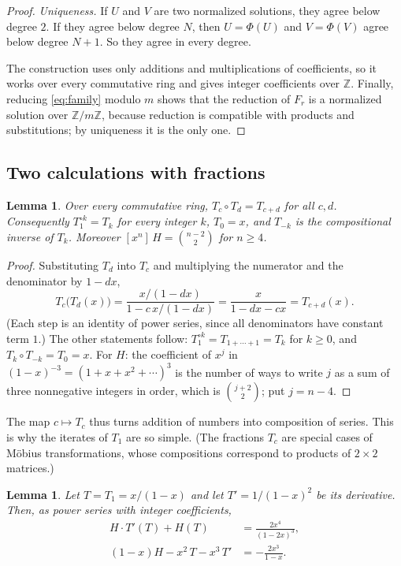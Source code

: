\documentclass[11pt,a4paper]{article}
\newtheorem{lemma}[theorem]{Lemma}
\theoremstyle{definition}
\theoremstyle{remark}
\newcommand{\Z}{\mathbb{Z}}
\newcommand{\coeff}[2]{[x^{#1}]\,#2}
\begin{document}
\begin{proof}
\emph{Uniqueness.} If $U$ and $V$ are two normalized solutions, they agree below degree $2$. If they agree below
degree $N$, then $U=\Phi(U)$ and $V=\Phi(V)$ agree below degree $N+1$. So they agree in every degree.

The construction uses only additions and multiplications of coefficients, so it works over every commutative ring
and gives integer coefficients over $\Z$. Finally, reducing \eqref{eq:family} modulo $m$ shows that the reduction of
$F_r$ is a normalized solution over $\Z/m\Z$, because reduction is compatible with products and substitutions; by
uniqueness it is the only one.
\end{proof}

\subsection{Two calculations with fractions}

\begin{lemma}\label{lem:mobius}
Over every commutative ring, $T_c\circ T_d=T_{c+d}$ for all $c,d$. Consequently $T_1^{\circ k}=T_k$ for every integer
$k$, $T_0=x$, and $T_{-k}$ is the compositional inverse of $T_k$. Moreover $\coeff{n}{H}=\binom{n-2}{2}$ for $n\ge4$.
\end{lemma}

\begin{proof}
Substituting $T_d$ into $T_c$ and multiplying the numerator and the denominator by $1-dx$,
\[
T_c\bigl(T_d(x)\bigr)=\frac{x/(1-dx)}{1-c\,x/(1-dx)}=\frac{x}{1-dx-cx}=T_{c+d}(x).
\]
(Each step is an identity of power series, since all denominators have constant term $1$.) The other statements
follow: $T_1^{\circ k}=T_{1+\cdots+1}=T_k$ for $k\ge0$, and $T_k\circ T_{-k}=T_0=x$. For $H$: the coefficient of $x^j$
in $(1-x)^{-3}=(1+x+x^2+\cdots)^3$ is the number of ways to write $j$ as a sum of three nonnegative integers in order,
which is $\binom{j+2}{2}$; put $j=n-4$.
\end{proof}

The map $c\mapsto T_c$ thus turns addition of numbers into composition of series. This is why the iterates of $T_1$
are so simple. (The fractions $T_c$ are special cases of M\"obius transformations, whose compositions correspond to
products of $2\times2$ matrices.)

\begin{lemma}\label{lem:ident}
Let $T=T_1=x/(1-x)$ and let $T'=1/(1-x)^2$ be its derivative. Then, as power series with integer coefficients,
\begin{align}
H\cdot T'(T)+H(T)&=\frac{2x^4}{(1-2x)^3},\label{eq:id1}\\
(1-x)H-x^2\,T-x^3\,T'&=-\frac{2x^3}{1-x}.\label{eq:id2}
\end{align}
\end{lemma}
\end{document}
